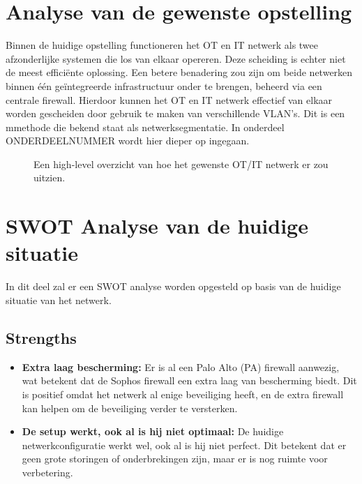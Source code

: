 \section{Analyse van de gewenste opstelling}
Binnen de huidige opstelling functioneren het OT en IT netwerk als twee afzonderlijke systemen die los van elkaar opereren. Deze scheiding is echter niet de meest efficiënte oplossing. Een betere benadering zou zijn om beide netwerken binnen één geïntegreerde infrastructuur onder te brengen, beheerd via een centrale firewall. Hierdoor kunnen het OT en IT netwerk effectief van elkaar worden gescheiden door gebruik te maken van verschillende VLAN’s. Dit is een mmethode die bekend staat als netwerksegmentatie. In onderdeel ONDERDEELNUMMER wordt hier dieper op ingegaan.

\begin{figure}[H]
    \centering
    \caption[high-level overzicht]{\label{fig:grail}Een high-level overzicht van hoe het gewenste OT/IT netwerk er zou uitzien.}
\end{figure}


\section{SWOT Analyse van de huidige situatie}
In dit deel zal er een SWOT analyse worden opgesteld op basis van de huidige situatie van het netwerk.


\subsection{Strengths}
\begin{itemize}
\item \textbf{Extra laag bescherming:} Er is al een Palo Alto (PA) firewall aanwezig, wat betekent dat de Sophos firewall een extra laag van bescherming biedt. Dit is positief omdat het netwerk al enige beveiliging heeft, en de extra firewall kan helpen om de beveiliging verder te versterken.

\item \textbf{De setup werkt, ook al is hij niet optimaal:} De huidige netwerkconfiguratie werkt wel, ook al is hij niet perfect. Dit betekent dat er geen grote storingen of onderbrekingen zijn, maar er is nog ruimte voor verbetering.


\end{itemize}

